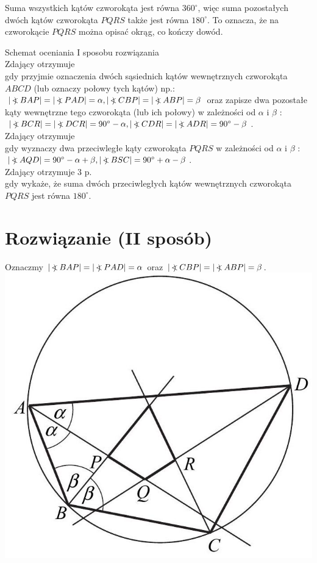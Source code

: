 \documentclass[10pt]{article}
\newcommand\Varangle{\mathop{{<\!\!\!\!\!\text{\small)}}\:}\nolimits}
\begin{document}
Suma wszystkich kątów czworokąta jest równa $360^{\circ}$, więc suma pozostałych dwóch kątów czworokąta $P Q R S$ także jest równa $180^{\circ}$. To oznacza, że na czworokącie $P Q R S$ można opisać okrąg, co kończy dowód.

Schemat oceniania I sposobu rozwiązania\\
Zdający otrzymuje\\
gdy przyjmie oznaczenia dwóch sąsiednich kątów wewnętrznych czworokąta $A B C D$ (lub oznaczy połowy tych kątów) np.: $|\Varangle B A P|=|\Varangle P A D|=\alpha,|\Varangle C B P|=|\Varangle A B P|=\beta$ oraz zapisze dwa pozostałe kąty wewnętrzne tego czworokąta (lub ich połowy) w zależności od $\alpha$ i $\beta$ : $|\Varangle B C R|=|\Varangle D C R|=90^{\circ}-\alpha,|\Varangle C D R|=|\Varangle A D R|=90^{\circ}-\beta$.\\
Zdający otrzymuje\\
gdy wyznaczy dwa przeciwległe kąty czworokąta $P Q R S$ w zależności od $\alpha$ i $\beta$ : $|\Varangle A Q D|=90^{\circ}-\alpha+\beta,|\Varangle B S C|=90^{\circ}+\alpha-\beta$.\\
Zdający otrzymuje 3 p.\\
gdy wykaże, że suma dwóch przeciwległych kątów wewnętrznych czworokąta $P Q R S$ jest równa $180^{\circ}$.

\section*{Rozwiązanie (II sposób)}
Oznaczmy $|\Varangle B A P|=|\Varangle P A D|=\alpha$ oraz $|\Varangle C B P|=|\Varangle A B P|=\beta$.\\
\includegraphics[max width=\textwidth, center]{2025_02_07_f5f4e8f37e6baab02e47g-08}
\end{document}
